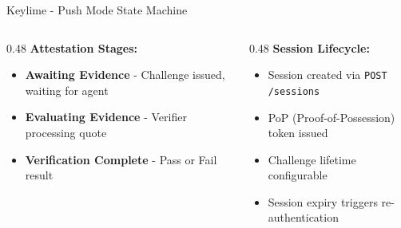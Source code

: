 \begin{frame}{Keylime - Push Mode State Machine}
  \vspace{0.05cm}

  \tiny
  \begin{columns}[T]
    \begin{column}{0.48\textwidth}
      \textbf{Attestation Stages:}
      \begin{itemize}
        \setlength{\itemsep}{0pt}
        \item \textbf{Awaiting Evidence} - Challenge issued, waiting for agent
        \item \textbf{Evaluating Evidence} - Verifier processing quote
        \item \textbf{Verification Complete} - Pass or Fail result
      \end{itemize}
    \end{column}
    \begin{column}{0.48\textwidth}
      \textbf{Session Lifecycle:}
      \begin{itemize}
        \setlength{\itemsep}{0pt}
        \item Session created via \texttt{POST /sessions}
        \item PoP (Proof-of-Possession) token issued
        \item Challenge lifetime configurable
        \item Session expiry triggers re-authentication
      \end{itemize}
    \end{column}
  \end{columns}
\end{frame}

